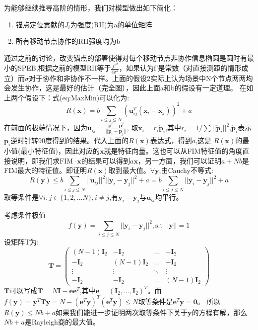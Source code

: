 \documentclass[12pt]{article}
\theoremstyle{remark}
\begin{document}
为能够继续推导高阶的情形，我们对模型做出如下简化：
\begin{enumerate}
\item{锚点定位贡献的$J_i$为强度(RII)为a的单位矩阵}
\item{所有移动节点协作的RII强度均为b}
\end{enumerate}
通过之前的讨论，改变锚点的部署使得对每个移动节点非协作信息椭圆是圆时有最小的SPEB,根据之前的模型RII等于$\frac{f'^2}{4\sigma^2}$，如果认为f'是常数（对直接测距的情形成立）而$\sigma$对于协作和非协作不一样。上面的假设2实际上认为场景中N个节点两两均会发生协作，这是最好的估计（完全图），因此上面a和b的假设有一定道理。
在如上两个假设下：式({eq:MaxMin})可以化为:
\begin{equation}
R(\bm{x})=b\sum_{i\leq j\leq N} (\bm{u}_{ij}^T(\bm{x}_i-\bm{x}_j))^2+a
\end{equation}
在前面的极端情况下，因为$\bm{u}_{ij}=\frac{\bm{p}^i-\bm{p}^j}{||\bm{p}_i-\bm{p}_j||}$,
取$\bm{x}_i=r_i\bm{\mathring{p}}_i$,其中$r_i=1/\sum ||\bm{\mathring{p}}_i||^2$,$\bm{\mathring{p}}_i$表示$\bm{p}_i$逆时针转90度得到的结果。代入上面的$R(\bm{x})$表达式，得到$a$,这是
$R(\bm{x})$的最小值(最小特征值)，因此对应的$\bm{x}$就是特征向量。这也可以从FIM特征值的角度直接说明，即我们求$\text{FIM}\cdot \bm{x}$的结果可以得到$a\bm{x}$，另一方面，我们可以证明$a+Nb$是FIM最大的特征值。即证明$R(\bm{x})$取到最大值。$\forall \bm{y}$,由Cauchy不等式:
\begin{equation}
R(\bm{y})\leq b\sum_{i\leq j\leq N} ||\bm{u}_{ij}||^2||\bm{y}_i-\bm{y}_j||^2+a=b\sum_{i\leq j\leq N}||\bm{y}_i-\bm{y}_j||^2+a
\end{equation}
取等条件是$\forall i,j\in \{1,2,...N\},i\neq j$,有$\bm{y}_i-\bm{y}_j$与$\bm{u}_{ij}$均平行。

考虑条件极值
\begin{equation}
f(\bm{y})=\sum_{i\leq j\leq N} ||\bm{y}_i-\bm{y}_j||^2,\text{s.t } ||\bm{y}||=1
\end{equation}
设矩阵T为:
\[
\bm{T}=\left(
\begin{array}{cccc}
(N-1)\bm{I}_2&-\bm{I}_2&\dots&-\bm{I}_2\\
-\bm{I}_2&(N-1)\bm{I}_2&\dots&-\bm{I}_2\\
\vdots & \vdots & \ddots & \vdots\\
-\bm{I}_2& -\bm{I}_2 & \dots & (N-1)\bm{I}_2
\end{array}
\right)
\]
$\bm{T}$可以写成$\bm{T}=N\bm{I}-\bm{e}\bm{e}^T$,其中$\bm{e}=(\bm{I}_2,\dots,\bm{I}_2)^T$。而$f(\bm{y})=\bm{y}^T\bm{T}\bm{y}=N-(\bm{e}^T\bm{y})^T(\bm{e}^T\bm{y})\leq N$取等条件是$\bm{e}^T\bm{y}=\bm{0}$。
所以$R(\bm{y})\leq Nb+a$如果我们能进一步证明两次取等条件下关于$\bm{y}$的方程有解，那么$Nb+a$是Rayleigh商的最大值。
\end{document}
